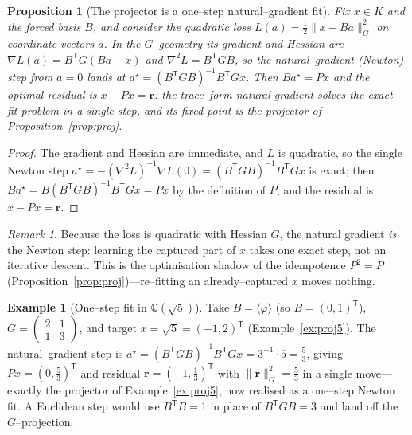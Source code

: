 \documentclass[11pt]{article}
\theoremstyle{plain}
\newtheorem{proposition}[theorem]{Proposition}
\theoremstyle{definition}
\newtheorem{example}[theorem]{Example}
\theoremstyle{remark}
\newtheorem{remark}[theorem]{Remark}
\newcommand{\Q}{\mathbb{Q}}
\newcommand{\K}{K}
\newcommand{\rr}{\mathbf{r}}
\newcommand{\GG}{G}
\newcommand{\BB}{B}
\newcommand{\transpose}{^{\mathsf{T}}}
\newcommand{\inv}{^{-1}}
\begin{document}
\begin{proposition}[The projector is a one--step natural--gradient fit]\label{prop:natgrad}
Fix $x\in\K$ and the forced basis $\BB$, and consider the quadratic loss
$L(a)=\tfrac12\lVert x-\BB a\rVert_{\GG}^2$ on coordinate vectors $a$. In the $\GG$--geometry its gradient and
Hessian are $\nabla L(a)=\BB\transpose\GG(\BB a-x)$ and $\nabla^2 L=\BB\transpose\GG\BB$, so the
natural--gradient (Newton) step from $a=0$ lands at $a^\star=(\BB\transpose\GG\BB)\inv\BB\transpose\GG x$.
Then $\BB a^\star=Px$ and the optimal residual is $x-Px=\rr$: the trace--form natural gradient solves the
exact--fit problem in a single step, and its fixed point is the projector of Proposition~\ref{prop:proj}.
\end{proposition}
\begin{proof}
The gradient and Hessian are immediate, and $L$ is quadratic, so the single Newton step
$a^\star=-(\nabla^2L)\inv\nabla L(0)=(\BB\transpose\GG\BB)\inv\BB\transpose\GG x$ is exact; then
$\BB a^\star=\BB(\BB\transpose\GG\BB)\inv\BB\transpose\GG x=Px$ by the definition of $P$, and the residual is
$x-Px=\rr$.
\end{proof}
\begin{remark}
Because the loss is quadratic with Hessian $\GG$, the natural gradient \emph{is} the Newton step: learning the
captured part of $x$ takes one exact step, not an iterative descent. This is the optimisation shadow of the
idempotence $P^2=P$ (Proposition~\ref{prop:proj})---re--fitting an already--captured $x$ moves nothing.
\end{remark}

\begin{example}[One--step fit in $\Q(\sqrt5)$]\label{ex:natgrad}
Take $\BB=\langle\varphi\rangle$ (so $\BB=(0,1)\transpose$), $\GG=\left(\begin{smallmatrix}2&1\\1&3\end{smallmatrix}\right)$,
and target $x=\sqrt5=(-1,2)\transpose$ (Example~\ref{ex:proj5}). The natural--gradient step is
$a^\star=(\BB\transpose\GG\BB)\inv\BB\transpose\GG x=3\inv\!\cdot 5=\tfrac53$, giving
$Px=(0,\tfrac53)\transpose$ and residual $\rr=(-1,\tfrac13)\transpose$ with
$\lVert\rr\rVert_{\GG}^2=\tfrac53$ in a single move---exactly the projector of Example~\ref{ex:proj5}, now
realised as a one--step Newton fit. A Euclidean step would use $\BB\transpose\BB=1$ in place of
$\BB\transpose\GG\BB=3$ and land off the $\GG$--projection.
\end{example}
\end{document}

